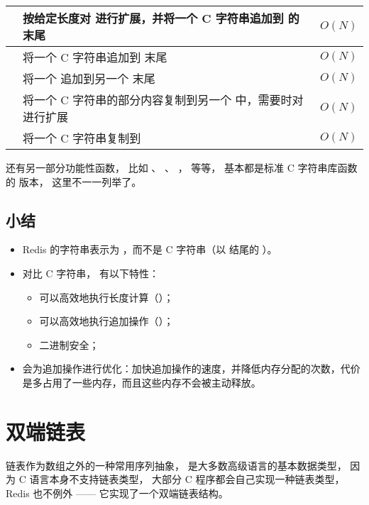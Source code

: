 \documentclass[a4paper,11pt,english]{sphinxmanual}
\begin{document}
\begin{tabulary}{\linewidth}{|p{3.5cm}|p{8.5cm}|p{2.5cm}|}
 & 
按给定长度对  进行扩展，并将一个 C 字符串追加到  的末尾
 & 
$O(N)$
\\\hline

 & 
将一个 C 字符串追加到  末尾
 & 
$O(N)$
\\\hline

 & 
将一个  追加到另一个  末尾
 & 
$O(N)$
\\\hline

 & 
将一个 C 字符串的部分内容复制到另一个  中，需要时对  进行扩展
 & 
$O(N)$
\\\hline

 & 
将一个 C 字符串复制到 
 & 
$O(N)$
\\\hline
\end{tabulary}


 还有另一部分功能性函数，
比如  、   、  ，
等等，
基本都是标准 C 字符串库函数的  版本，
这里不一一列举了。


\subsection{小结}
\label{internal-datastruct/sds:id6}\begin{itemize}
\item {} 
Redis 的字符串表示为  ，而不是 C 字符串（以  结尾的 ）。

\item {} 
对比 C 字符串，  有以下特性：
\begin{itemize}
\item {} 
可以高效地执行长度计算（）；

\item {} 
可以高效地执行追加操作（）；

\item {} 
二进制安全；

\end{itemize}

\item {} 
 会为追加操作进行优化：加快追加操作的速度，并降低内存分配的次数，代价是多占用了一些内存，而且这些内存不会被主动释放。

\end{itemize}


\section{双端链表}
\label{internal-datastruct/adlist::doc}\label{internal-datastruct/adlist:id1}
链表作为数组之外的一种常用序列抽象，
是大多数高级语言的基本数据类型，
因为 C 语言本身不支持链表类型，
大部分 C 程序都会自己实现一种链表类型，
Redis 也不例外 —— 它实现了一个双端链表结构。
\end{document}
